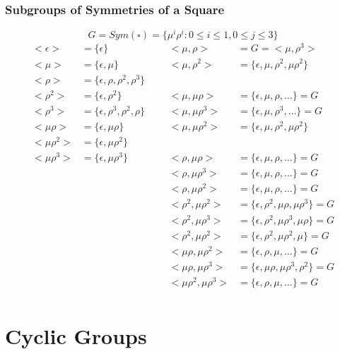 \documentclass[openany]{report}
\begin{document}
\subsection{Subgroups of Symmetries of a Square}
$$G = Sym(\square) = \{\mu^i\rho^i : 0 \leq i \leq 1, 0 \leq j \leq 3\}$$
\begin{align*}
    <\epsilon> &= \{\epsilon\} &&& <\mu,\rho> &= G = <\mu,\rho^3>\\
    <\mu> &= \{\epsilon,\mu\} &&& <\mu, \rho^2> &= \{\epsilon, \mu, \rho^2, \mu\rho^2\}\\
    <\rho> &= \{\epsilon, \rho,\rho^2,\rho^3\}\\
    <\rho^2> &= \{\epsilon,\rho^2\} &&& <\mu, \mu\rho> &=\{\epsilon, \mu, \rho, \dots\} = G\\
    <\rho^3> &= \{\epsilon, \rho^3, \rho^2,\rho\} &&& <\mu, \mu\rho^3> &=\{\epsilon, \mu, \rho^3, \dots\} = G\\
    <\mu\rho> &= \{\epsilon, \mu\rho\} &&& <\mu, \mu\rho^2> &= \{\epsilon, \mu, \rho^2, \mu\rho^2\}\\
    <\mu\rho^2> &= \{\epsilon, \mu\rho^2\}\\
    <\mu\rho^3> &= \{\epsilon, \mu\rho^3\} &&& <\rho, \mu\rho> &= \{\epsilon, \mu, \rho, \dots\} = G\\
    & &&& <\rho, \mu\rho^3> &= \{\epsilon, \mu, \rho, \dots\} = G\\
    & &&& <\rho, \mu\rho^2> &= \{\epsilon, \mu, \rho, \dots\} = G\\
    & &&& <\rho^2, \mu\rho^2> &= \{\epsilon, \rho^2, \mu\rho,\mu\rho^3\} = G\\
    & &&& <\rho^2, \mu\rho^3> &= \{\epsilon, \rho^2, \mu\rho^3,\mu\rho\} = G\\
    & &&& <\rho^2, \mu\rho^2> &= \{\epsilon, \rho^2, \mu\rho^2,\mu\} = G\\
    & &&& <\mu\rho, \mu\rho^2> &= \{\epsilon, \rho, \mu,\dots\} = G\\
    & &&& <\mu\rho, \mu\rho^3> &= \{\epsilon, \mu\rho, \mu\rho^3,\rho^2\} = G\\
    & &&& <\mu\rho^2, \mu\rho^3> &= \{\epsilon, \rho, \mu,\dots\} = G\\
\end{align*}

\chapter{Cyclic Groups}
\end{document}

